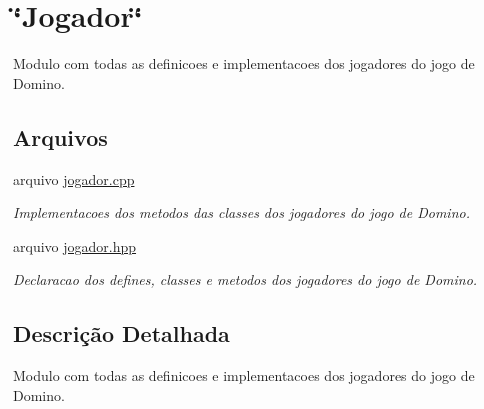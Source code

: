 \hypertarget{group__MOD__JOGADOR}{
\section{\char`\"{}Jogador\char`\"{}}
\label{group__MOD__JOGADOR}
}


Modulo com todas as definicoes e implementacoes dos jogadores do jogo de Domino.  


\subsection*{Arquivos}
\begin{DoxyCompactItemize}
\item 
arquivo \hyperlink{jogador_8cpp}{jogador.cpp}


\begin{DoxyCompactList}\small\item\em Implementacoes dos metodos das classes dos jogadores do jogo de Domino. \item\end{DoxyCompactList}

\item 
arquivo \hyperlink{jogador_8hpp}{jogador.hpp}


\begin{DoxyCompactList}\small\item\em Declaracao dos defines, classes e metodos dos jogadores do jogo de Domino. \item\end{DoxyCompactList}

\end{DoxyCompactItemize}


\subsection{Descrição Detalhada}
Modulo com todas as definicoes e implementacoes dos jogadores do jogo de Domino. 